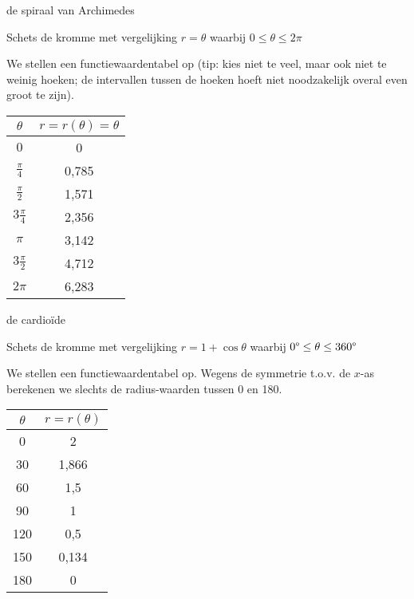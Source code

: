 \begin{voorbeeld}
	de spiraal van Archimedes

Schets de kromme met vergelijking $r=\theta$ waarbij $0\leq\theta\leq2\pi$

We stellen een functiewaardentabel op (tip: kies niet te veel, maar
ook niet te weinig hoeken; de intervallen tussen de hoeken hoeft niet
noodzakelijk overal even groot te zijn).

\begin{minipage}{.48\linewidth}
	\centering
	\begin{tabular}{c|c}
		$\theta$ & $r=r(\theta)=\theta$\\
		\hline 
		$0$ & 0\\
		$\frac{\pi}{4}$ & 0,785 \\
		$\frac{\pi}{2}$ & 1,571\\
		$3\frac{\pi}{4}$ & 2,356\\
		$\pi$ & 3,142\\
		$3\frac{\pi}{2}$ & 4,712\\
		$2\pi$ & 6,283\\
	\end{tabular}
\end{minipage}
\begin{minipage}{.48\linewidth}

\end{minipage}

\end{voorbeeld}
\begin{voorbeeld}
	de cardio\"ide

Schets de kromme met vergelijking $r=1+\cos\theta$ waarbij $0\text{\textdegree}\leq\theta\leq360\text{\textdegree}$

We stellen een functiewaardentabel op. Wegens de symmetrie t.o.v.
de $x$-as berekenen we slechts de radius-waarden tussen 0\textdegree{}
en 180\textdegree .

\begin{minipage}{0.5\linewidth}
	\centering
\begin{tabular}{c|c}
$\theta$ & $r=r(\theta)$\\
\hline 
0\textdegree{} & 2\\
30\textdegree{} & 1,866\\
60\textdegree{} & 1,5\\
90\textdegree{} & 1\\
120\textdegree{} & 0,5\\
150\textdegree{} & 0,134\\
180\textdegree{} & 0\\
\end{tabular}
\end{minipage}
\begin{minipage}{.48\linewidth}
	
\end{minipage} 

\end{voorbeeld}

